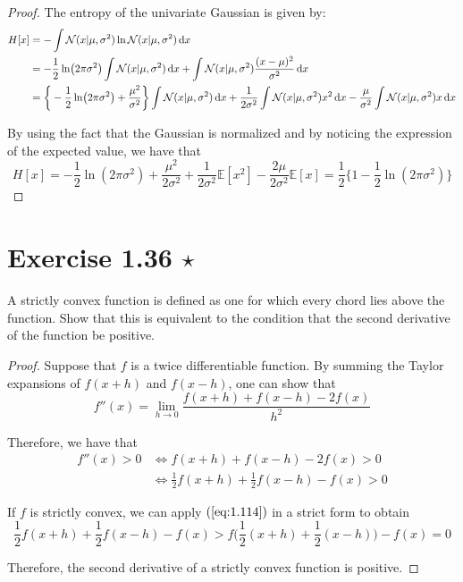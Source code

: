 \begin{proof}
    The entropy of the univariate Gaussian is given by:
    \begin{align*}
        H[x] 
        &= -\int \mathcal{N}(x | \mu, \sigma^2) \ln \mathcal{N}(x | \mu, \sigma^2) \mathop{}\!\mathrm{d} x \\
        &= -\frac{1}{2} \ln (2\pi \sigma^2) \int \mathcal{N}(x | \mu, \sigma^2) \mathop{}\!\mathrm{d} x 
            + \int \mathcal{N}(x | \mu, \sigma^2) \frac{(x - \mu)^2}{\sigma^2} \mathop{}\!\mathrm{d} x \\
        &= \bigg\{-\frac{1}{2} \ln (2\pi \sigma^2) + \frac{\mu^2}{\sigma^2} \bigg\}
            \int \mathcal{N}(x | \mu, \sigma^2) \mathop{}\!\mathrm{d} x 
            + \frac{1}{2\sigma^2} \int \mathcal{N}(x | \mu, \sigma^2) x^2 \mathop{}\!\mathrm{d} x 
            - \frac{\mu}{\sigma^2} \int \mathcal{N}(x | \mu, \sigma^2) x\mathop{}\!\mathrm{d} x
    \end{align*}

    By using the fact that the Gaussian is normalized and 
    by noticing the expression of the expected value, we have that
    \[
        H[x] 
        = -\frac{1}{2} \ln(2\pi \sigma^2) 
        + \frac{\mu^2}{2\sigma^2} 
        + \frac{1}{2\sigma^2} \mathbb{E}[x^2]
        - \frac{2\mu}{2\sigma^2} \mathbb{E}[x]
        = \frac{1}{2} \bigg\{1 - \frac{1}{2} \ln(2\pi \sigma^2)\bigg\} \tag{1.110}
    \]
\end{proof}

\section*{Exercise 1.36 $\star$}
A strictly convex function is defined as one for which every chord lies
above the function. Show that this is equivalent to the condition that
the second derivative of the function be positive.

\vspace{1em}

\begin{proof}
    Suppose that $f$ is a twice differentiable function. By 
    summing the Taylor expansions of $f(x + h)$ and $f(x - h)$, 
    one can show that
    \[
        f''(x) = \lim_{h \to 0} \frac{f(x + h) + f(x - h) - 2f(x)}{h^2}
    \] 

    Therefore, we have that
    \begin{align*}
        f''(x) > 0 
        &\iff f(x + h) + f(x - h) - 2f(x) > 0 \\
        & \iff \frac{1}{2} f(x + h) + \frac{1}{2} f(x - h) - f(x) > 0
    \end{align*}

    If $f$ is strictly convex, we can apply $(\ref{eq:1.114})$ in a strict form to obtain 
    \[
        \frac{1}{2} f(x + h) + \frac{1}{2} f(x - h) - f(x) >
        f\bigg(\frac{1}{2}(x+h) + \frac{1}{2}(x - h)\bigg) - f(x) = 0
    \] 

    Therefore, the second derivative of a strictly convex function is positive.
\end{proof}


